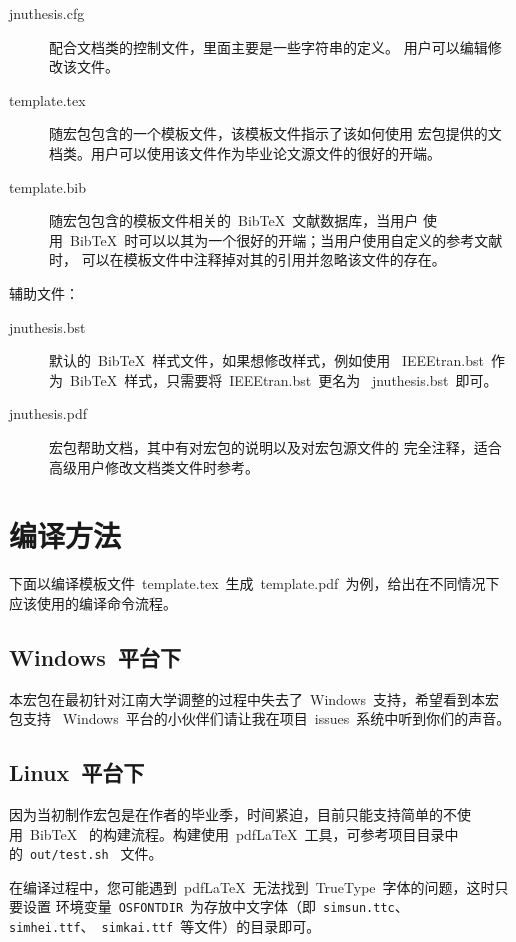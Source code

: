 \documentclass[pdftex, twoside, bachelor]{JNUthesis}
\begin{document}
\begin{spacing}{1.25}
\begin{description}
\item[jnuthesis.cfg] 配合文档类的控制文件，里面主要是一些字符串的定义。
  用户可以编辑修改该文件。

\item[template.tex] 随宏包包含的一个模板文件，该模板文件指示了该如何使用
  宏包提供的文档类。用户可以使用该文件作为毕业论文源文件的很好的开端。

\item[template.bib] 随宏包包含的模板文件相关的~BibTeX~文献数据库，当用户
  使用~BibTeX~时可以以其为一个很好的开端；当用户使用自定义的参考文献时，
  可以在模板文件中注释掉对其的引用并忽略该文件的存在。
\end{description}

辅助文件：

\begin{description}
\item[jnuthesis.bst] 默认的~BibTeX~样式文件，如果想修改样式，例如使用
  ~IEEEtran.bst~作为~BibTeX~样式，只需要将~IEEEtran.bst~更名为
  ~jnuthesis.bst~即可。

\item[jnuthesis.pdf] 宏包帮助文档，其中有对宏包的说明以及对宏包源文件的
  完全注释，适合高级用户修改文档类文件时参考。
\end{description}

\section{编译方法}

下面以编译模板文件~template.tex~生成~template.pdf~为例，给出在不同情况下
应该使用的编译命令流程。

\subsection{Windows~平台下}

本宏包在最初针对江南大学调整的过程中失去了~Windows~支持，希望看到本宏包支持~
Windows~平台的小伙伴们请让我在项目~issues~系统中听到你们的声音。

\subsection{Linux~平台下}

因为当初制作宏包是在作者的毕业季，时间紧迫，目前只能支持简单的不使用~BibTeX~
的构建流程。构建使用~pdf\LaTeX{}~工具，可参考项目目录中的~\texttt{out/test.sh}~
文件。

在编译过程中，您可能遇到~pdf\LaTeX{}~无法找到~TrueType~字体的问题，这时只要设置
环境变量~\texttt{OSFONTDIR}~为存放中文字体（即~\texttt{simsun.ttc}、~
\texttt{simhei.ttf}、~\texttt{simkai.ttf}~等文件）的目录即可。


\end{spacing}
\end{document}
